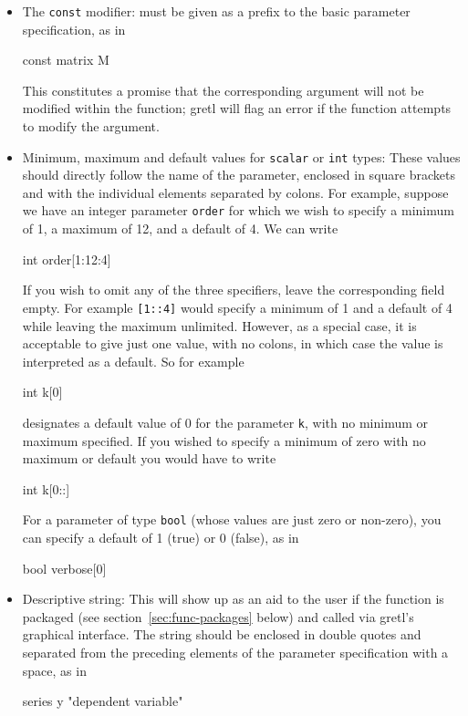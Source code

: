 \begin{itemize}

\item The \texttt{const} modifier: must be given as a prefix to the
  basic parameter specification, as in
%    
\begin{code}
const matrix M
\end{code} 
%
  This constitutes a promise that the corresponding argument will not
  be modified within the function; gretl will flag an error if the
  function attempts to modify the argument.

\item Minimum, maximum and default values for \texttt{scalar} or
  \texttt{int} types: These values should directly follow the name of
  the parameter, enclosed in square brackets and with the individual
  elements separated by colons.  For example, suppose we have an
  integer parameter \texttt{order} for which we wish to specify a
  minimum of 1, a maximum of 12, and a default of 4.  We can write
%    
\begin{code}
int order[1:12:4]
\end{code} 
%
  If you wish to omit any of the three specifiers, leave the
  corresponding field empty.  For example \texttt{[1::4]} would
  specify a minimum of 1 and a default of 4 while leaving the maximum
  unlimited. However, as a special case, it is acceptable to give just
  one value, with no colons, in which case the value is interpreted as
  a default. So for example
%    
\begin{code}
int k[0]
\end{code}
%
  designates a default value of 0 for the parameter \texttt{k}, with
  no minimum or maximum specified. If you wished to specify a minimum
  of zero with no maximum or default you would have to write
%    
\begin{code}
int k[0::]
\end{code}

  For a parameter of type \texttt{bool} (whose values are just zero or
  non-zero), you can specify a default of 1 (true) or 0 (false), as in
%    
\begin{code}
bool verbose[0]
\end{code} 

\item Descriptive string: This will show up as an aid to the user if
  the function is packaged (see section~\ref{sec:func-packages} below)
  and called via gretl's graphical interface.  The string should
  be enclosed in double quotes and separated from the preceding
  elements of the parameter specification with a space, as in
%
\begin{code}
series y "dependent variable"
\end{code} 


\end{itemize}
